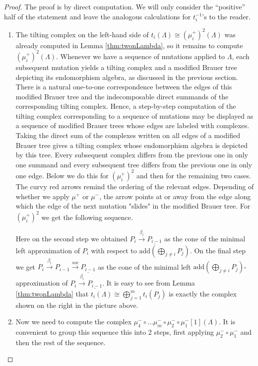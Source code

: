 \documentclass[10pt,a4paper]{amsart}
\newcommand{\add}{{\mathrm{add}}}
\begin{document}
\begin{proof}  The proof is by direct computation. We will only consider the ``positive'' half of the statement and leave the analogous calculations for $t_i^{-1}$'s to the reader.
\begin{enumerate} 
    \item The tilting complex on the left-hand side of $t_i(\Lambda) \cong (\mu_i^+)^2(\Lambda)$ was already computed in Lemma \ref{thm:twonLambda}, so it remains to compute $(\mu_i^+)^2(\Lambda)$. Whenever we have a sequence of mutations applied to $\Lambda$, each subsequent mutation yields a tilting complex and a modified Brauer tree depicting its endomorphism algebra, as discussed in the previous section. There is a natural one-to-one correspondence between the edges of this modified Brauer tree and the indecomposable direct summands of the corresponding tilting complex. Hence, a step-by-step computation of the tilting complex corresponding to a sequence of mutations may be displayed as a sequence of modified Brauer trees whose edges are labeled with complexes. Taking the direct sum of the complexes written on all edges of a modified Brauer tree gives a tilting complex whose endomorphism algebra is depicted by this tree. Every subsequent complex differs from the previous one in only one summand and every subsequent tree differs from the previous one in only one edge. Below we do this for $(\mu_i^+)^2$ and then for the remaining two cases. The curvy red arrows remind the ordering of the relevant edges. Depending of whether we apply $\mu^+$ or $\mu^-$, the arrow points at or away from the edge along which the edge of the next mutation "slides" in the modified Brauer tree. For $(\mu_i^+)^2$ we get the following sequence. 
     \begin{figure}[H]
  
\end{figure}
\noindent Here on the second step we obtained $P_i \xrightarrow{\beta_i} \underline{P_{i-1}}$ as the cone of the minimal left approximation of $P_i$ with respect to $\add(\bigoplus\nolimits_{j\neq i} P_j)$. On the final step we get $P_i \xrightarrow{\beta_i} P_{i-1} \xrightarrow{soc} \underline{P_{i-1}}$ as the cone of the minimal left $\add (\bigoplus\nolimits_{j\neq i} P_j)$-approximation of $P_i \xrightarrow{\beta_i} \underline{P_{i-1}}$. It is easy to see from Lemma \ref{thm:twonLambda} that $t_i(\Lambda) \cong \bigoplus_{j=1}^m t_i(P_j)$ is exactly the complex shown on the right in the picture above.

    \item Now we need to compute the complex $\mu_4^- \circ \dots \mu_m^- \circ \mu_2^- \circ \mu_1^-[1](\Lambda)$. It is convenient to group this sequence this into 2 steps, first applying $\mu_2^- \circ \mu_1^-$ and then the rest of the sequence. 
    

\end{enumerate}
\end{proof}
\end{document}
